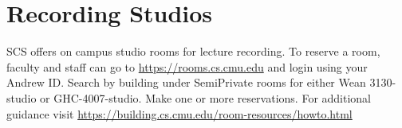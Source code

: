 \chapter{Recording Studios}
\label{ch:studios}

\begin{gram}
\label{grm:studios::reservations}
SCS offers on campus studio rooms for lecture recording. To reserve a room, faculty and staff can go to \href{https://rooms.cs.cmu.edu}{https://rooms.cs.cmu.edu} and login using your Andrew ID. Search by building under SemiPrivate rooms for either Wean 3130-studio or GHC-4007-studio. Make one or more reservations. For additional guidance visit \href{https://building.cs.cmu.edu/room-resources/howto.html}{https://building.cs.cmu.edu/room-resources/howto.html}
\end{gram}

\begin{gram}
\label{grm:studios::demo}
\end{gram}
